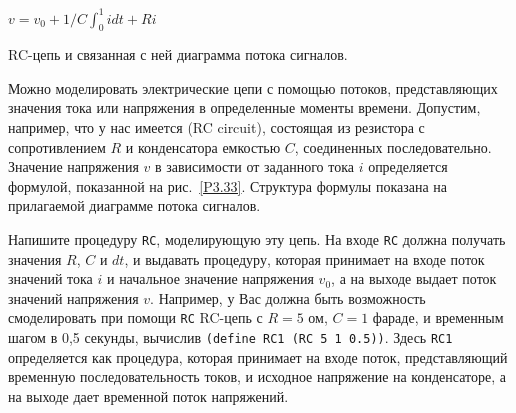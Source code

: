 \begin{cntrfig}

$v = v_0 + 1/C \int_0^1idt + Ri$


\caption{RC-цепь и связанная с ней диаграмма
потока сигналов.}
\label{P3.33}

\end{cntrfig}
\begin{exercise}{3.73}\label{EX3.73}%
%
%
%
%
%
%
Можно моделировать электрические цепи с помощью
потоков, представляющих значения тока или напряжения в определенные
моменты времени.  Допустим, например, что у нас имеется
 (RC circuit),
состоящая из резистора с
сопротивлением $R$ и конденсатора емкостью $C$,
соединенных последовательно.  Значение напряжения $v$ в
зависимости от заданного тока $i$ определяется формулой,
показанной на рис.~\ref{P3.33}. Структура формулы показана
на прилагаемой диаграмме потока сигналов.

Напишите процедуру {\tt RC}, моделирующую эту
цепь. На входе {\tt RC} должна получать значения
$R$, $C$ и $dt$, и выдавать
процедуру, которая принимает на входе поток значений тока
$i$ и начальное значение напряжения $v_0$, а на
выходе выдает поток значений напряжения $v$.  Например, у Вас
должна быть возможность смоделировать при помощи {\tt RC} RC-цепь
с $R = 5$ ом, $C = 1$ фараде, и временным шагом
в 0,5 секунды, вычислив {\tt (define RC1 (RC 5 1 0.5))}.  Здесь
{\tt RC1} определяется как процедура, которая принимает на
входе поток, представляющий временную последовательность токов, и
исходное напряжение на конденсаторе, а на выходе дает временной
поток напряжений.
\end{exercise}

